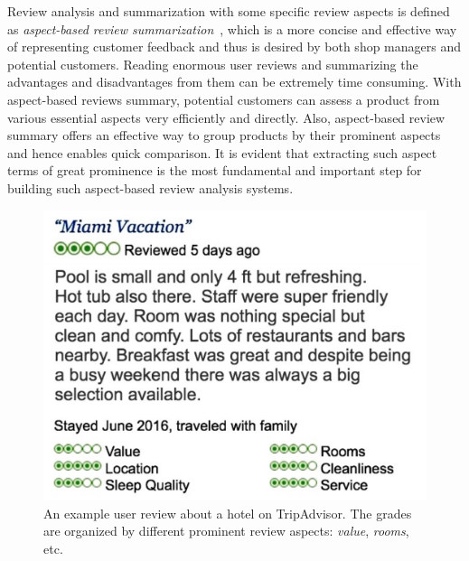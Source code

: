 Review analysis and summarization with some specific review aspects is defined 
as \emph{aspect-based review summarization}~\cite{hu2004mining}, 
which is a more concise
and effective way of representing customer feedback and thus 
is desired by both shop managers and potential customers.
Reading enormous user reviews and summarizing the advantages and disadvantages from them can be extremely time consuming. 
With aspect-based reviews summary, potential customers can 
assess a product from various essential aspects very efficiently and directly.
Also, aspect-based review summary offers an effective 
way to group products by their prominent aspects and hence
enables quick comparison.
It is evident that extracting such aspect terms of great prominence is the most fundamental and important step for building such aspect-based review analysis systems.                                        
\begin{figure}[h!]
	\centering
	\includegraphics[width=0.8\columnwidth]{figures/tripadvisor}
	\caption{An example user review about a hotel on TripAdvisor. 
		The grades are organized by different prominent review aspects: \textit{value}, \textit{rooms}, etc. }
	\label{fig:tripadvisor}
\end{figure}                                



